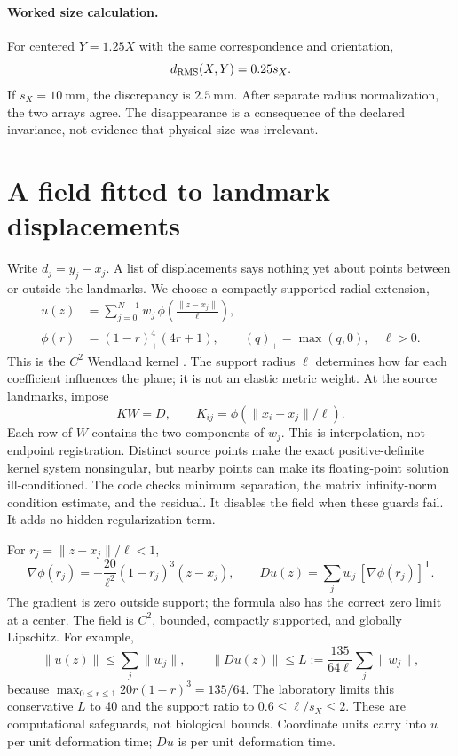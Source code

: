 \documentclass[11pt]{article}
\begin{document}
\paragraph{Worked size calculation.}
For centered $Y=1.25X$ with the same correspondence and orientation,
\[
 d_{\mathrm{RMS}}(X,Y)=0.25s_X.
\]
If $s_X=10\ \mathrm{mm}$, the discrepancy is $2.5\ \mathrm{mm}$. After separate radius normalization, the two arrays agree. The disappearance is a consequence of the declared invariance, not evidence that physical size was irrelevant.

\section{A field fitted to landmark displacements}\label{sec:field}
Write $d_j=y_j-x_j$. A list of displacements says nothing yet about points between or outside the landmarks. We choose a compactly supported radial extension,
\begin{align}
 u(z)&=\sum_{j=0}^{N-1}w_j\,\phi\!\left(\frac{\|z-x_j\|}{\ell}\right),\label{eq:field}\\
 \phi(r)&=(1-r)_+^4(4r+1),\qquad (q)_+=\max(q,0),\quad \ell>0.
\end{align}
This is the $C^2$ Wendland kernel \cite{wendland}. The support radius $\ell$ determines how far each coefficient influences the plane; it is not an elastic metric weight. At the source landmarks, impose
\[
 K W=D,\qquad K_{ij}=\phi(\|x_i-x_j\|/\ell).
\]
Each row of $W$ contains the two components of $w_j$. This is interpolation, not endpoint registration. Distinct source points make the exact positive-definite kernel system nonsingular, but nearby points can make its floating-point solution ill-conditioned. The code checks minimum separation, the matrix infinity-norm condition estimate, and the residual. It disables the field when these guards fail. It adds no hidden regularization term.

For $r_j=\|z-x_j\|/\ell<1$,
\[
 \nabla\phi(r_j)=-\frac{20}{\ell^2}(1-r_j)^3(z-x_j),\qquad
 Du(z)=\sum_j w_j\,[\nabla\phi(r_j)]^{\mathsf T}.
\]
The gradient is zero outside support; the formula also has the correct zero limit at a center. The field is $C^2$, bounded, compactly supported, and globally Lipschitz. For example,
\[
 \|u(z)\|\le\sum_j\|w_j\|,\qquad
 \|Du(z)\|\le L:=\frac{135}{64\ell}\sum_j\|w_j\|,
\]
because $\max_{0\le r\le1}20r(1-r)^3=135/64$. The laboratory limits this conservative $L$ to 40 and the support ratio to $0.6\le\ell/s_X\le2$. These are computational safeguards, not biological bounds. Coordinate units carry into $u$ per unit deformation time; $Du$ is per unit deformation time.
\end{document}
